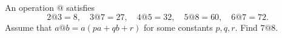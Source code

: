 An operation $@$ satisfies
\[2@3=8,\quad3@7=27,\quad4@5=32,\quad5@8=60,\quad6@7=72.\]
Assume that $a@b=a(pa+qb+r)$ for some constants $p,q,r$. Find $7@8$.
